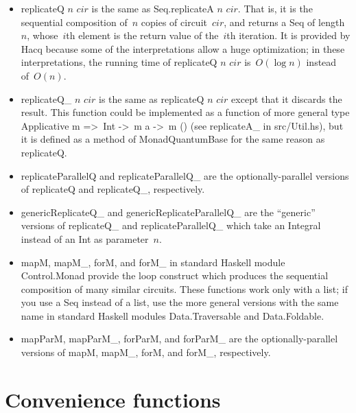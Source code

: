 \documentclass[11pt]{article}
\newcommand{\var}[1]{\mathit{#1}}
\begin{document}
\begin{itemize}
\item
  \textsf{replicateQ $\var{n}$ $\var{cir}$}
  is the same as \textsf{Seq.replicateA $\var{n}$ $\var{cir}$}.
  That is, it is the sequential composition of~$n$ copies of circuit~$\var{cir}$,
  and returns a \textsf{Seq} of length~$n$,
  whose~$i$th element is the return value of the~$i$th iteration.
  It is provided by Hacq because some of the interpretations allow a huge optimization;
  in these interpretations, the running time of \textsf{replicateQ $\var{n}$ $\var{cir}$}
  is~$O(\log n)$ instead of~$O(n)$.
\item
  \textsf{replicateQ\_ $\var{n}$ $\var{cir}$}
  is the same as \textsf{replicateQ $\var{n}$ $\var{cir}$}
  except that it discards the result.
  This function could be implemented as a function
  of more general type \textsf{Applicative m =\textgreater\ Int -\textgreater\ m a -\textgreater\  m ()}
  (see \textsf{replicateA\_} in src/Util.hs),
  but it is defined as a method of \textsf{MonadQuantumBase} for the same reason as \textsf{replicateQ}.
\item
  \textsf{replicateParallelQ} and \textsf{replicateParallelQ\_}
  are the optionally-parallel versions of \textsf{replicateQ} and \textsf{replicateQ\_}, respectively.
\item
  \textsf{genericReplicateQ\_} and \textsf{genericReplicateParallelQ\_}
  are the ``generic'' versions of \textsf{replicateQ\_} and \textsf{replicateParallelQ\_}
  which take an \textsf{Integral} instead of an \textsf{Int} as parameter~$n$.
\item
  \textsf{mapM}, \textsf{mapM\_}, \textsf{forM}, and \textsf{forM\_}
  in standard Haskell module \textsf{Control.Monad}
  provide the loop construct
  which produces the sequential composition of many similar circuits.
  These functions work only with a list; if you use a \textsf{Seq} instead of a list,
  use the more general versions with the same name in standard Haskell modules
  \textsf{Data.Traversable} and \textsf{Data.Foldable}.
\item
  \textsf{mapParM}, \textsf{mapParM\_}, \textsf{forParM}, and \textsf{forParM\_}
  are the optionally-parallel versions
  of \textsf{mapM}, \textsf{mapM\_}, \textsf{forM}, and \textsf{forM\_}, respectively.
\end{itemize}

\section{Convenience functions}
\end{document}
